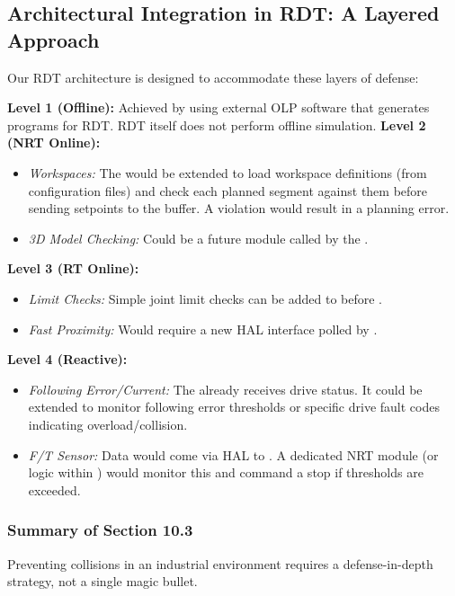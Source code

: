 \subsection{Architectural Integration in RDT: A Layered Approach}
\label{subsec:collision_rdt_integration}

Our RDT architecture is designed to accommodate these layers of defense:

\textbf{Level 1 (Offline):} Achieved by using external OLP software that generates programs for RDT. RDT itself does not perform offline simulation.
\textbf{Level 2 (NRT Online):}
        \begin{itemize}
            \item \textit{Workspaces:} The  would be extended to load workspace definitions (from configuration files) and check each planned segment against them before sending setpoints to the buffer. A violation would result in a planning error.
            \item \textit{3D Model Checking:} Could be a future module called by the .
        \end{itemize}
\textbf{Level 3 (RT Online):}
        \begin{itemize}
            \item \textit{Limit Checks:} Simple joint limit checks can be added to  before .
            \item \textit{Fast Proximity:} Would require a new  HAL interface polled by .
        \end{itemize}
\textbf{Level 4 (Reactive):}
        \begin{itemize}
            \item \textit{Following Error/Current:} The  already receives drive status. It could be extended to monitor following error thresholds or specific drive fault codes indicating overload/collision.
            \item \textit{F/T Sensor:} Data would come via HAL to . A dedicated NRT module (or logic within ) would monitor this and command a stop if thresholds are exceeded.
        \end{itemize}


\subsubsection{Summary of Section 10.3}
\label{subsubsec:section10_3_summary}
Preventing collisions in an industrial environment requires a defense-in-depth strategy, not a single magic bullet.

